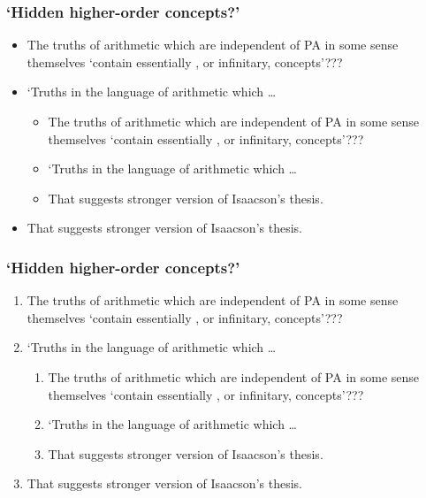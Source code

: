 \documentclass[ignorenonframetext, aspectratio=169]{beamer}
\begin{document}
\begin{frame}
	\frametitle{`Hidden higher-order concepts?'}
	\begin{itemize}[<+->]
	\item The truths of arithmetic which are independent of PA in some 
	sense themselves `{contain} essentially {\color{blue}{hidden higher-order}},
	 or infinitary, concepts'???
	\item `Truths in the language of arithmetic which \ldots
		\begin{itemize}[<+->]
		\item The truths of arithmetic which are independent of PA in some 
		sense themselves `{contain} essentially {\color{blue}{hidden higher-order}},
		 or infinitary, concepts'???
		\item `Truths in the language of arithmetic which \ldots
		\item	That suggests stronger version of Isaacson's thesis. 
		\end{itemize}
	\item	That suggests stronger version of Isaacson's thesis. 
	\end{itemize}
\end{frame}

\begin{frame}
	\frametitle{`Hidden higher-order concepts?'}
	\begin{enumerate}[<+->]
	\item The truths of arithmetic which are independent of PA in some 
	sense themselves `{contain} essentially {\color{blue}{hidden higher-order}},
	 or infinitary, concepts'???
	\item `Truths in the language of arithmetic which \ldots
		\begin{enumerate}[<+->]
		\item The truths of arithmetic which are independent of PA in some 
		sense themselves `{contain} essentially {\color{blue}{hidden higher-order}},
		 or infinitary, concepts'???
		\item `Truths in the language of arithmetic which \ldots
		\item	That suggests stronger version of Isaacson's thesis. 
		\end{enumerate}
	\item	That suggests stronger version of Isaacson's thesis. 
	\end{enumerate}
\end{frame}
\end{document}
